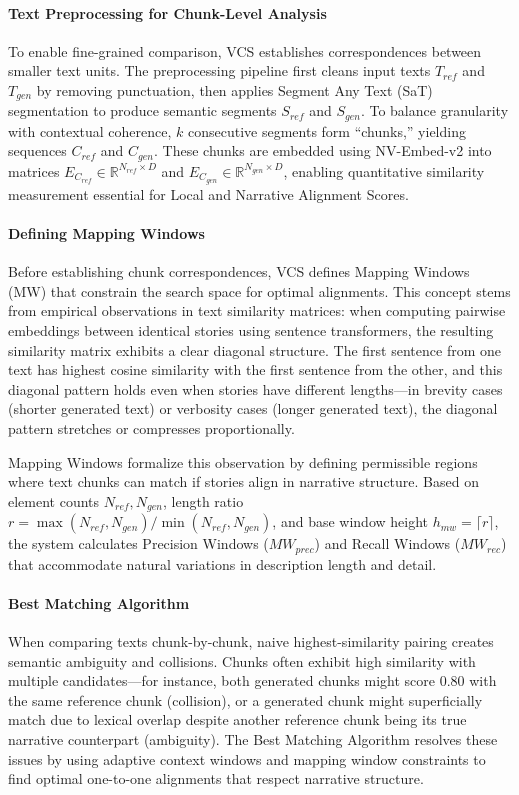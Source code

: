 \documentclass[letterpaper]{article} %
\begin{document}
\paragraph{Text Preprocessing for Chunk-Level Analysis}
To enable fine-grained comparison, VCS establishes correspondences between smaller text units. The preprocessing pipeline first cleans input texts $T_{ref}$ and $T_{gen}$ by removing punctuation, then applies Segment Any Text (SaT)~\citep{frohmann-etal-2024-segment} segmentation to produce semantic segments $S_{ref}$ and $S_{gen}$. To balance granularity with contextual coherence, $k$ consecutive segments form ``chunks,'' yielding sequences $C_{ref}$ and $C_{gen}$. These chunks are embedded using NV-Embed-v2 into matrices $E_{C_{ref}} \in \mathbb{R}^{N_{ref} \times D}$ and $E_{C_{gen}} \in \mathbb{R}^{N_{gen} \times D}$, enabling quantitative similarity measurement essential for Local and Narrative Alignment Scores.

\paragraph{Defining Mapping Windows}
Before establishing chunk correspondences, VCS defines Mapping Windows (MW) that constrain the search space for optimal alignments. This concept stems from empirical observations in text similarity matrices: when computing pairwise embeddings between identical stories using sentence transformers, the resulting similarity matrix exhibits a clear diagonal structure. The first sentence from one text has highest cosine similarity with the first sentence from the other, and this diagonal pattern holds even when stories have different lengths—in brevity cases (shorter generated text) or verbosity cases (longer generated text), the diagonal pattern stretches or compresses proportionally.

Mapping Windows formalize this observation by defining permissible regions where text chunks can match if stories align in narrative structure. Based on element counts $N_{ref}, N_{gen}$, length ratio $r = \max(N_{ref}, N_{gen}) / \min(N_{ref}, N_{gen})$, and base window height $h_{mw} = \lceil r \rceil$, the system calculates Precision Windows ($MW_{prec}$) and Recall Windows ($MW_{rec}$) that accommodate natural variations in description length and detail.

\paragraph{Best Matching Algorithm}
When comparing texts chunk-by-chunk, naive highest-similarity pairing creates semantic ambiguity and collisions. Chunks often exhibit high similarity with multiple candidates—for instance, both generated chunks might score 0.80 with the same reference chunk (collision), or a generated chunk might superficially match due to lexical overlap despite another reference chunk being its true narrative counterpart (ambiguity). The Best Matching Algorithm resolves these issues by using adaptive context windows and mapping window constraints to find optimal one-to-one alignments that respect narrative structure.
\end{document}

